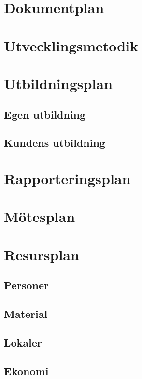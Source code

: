 \documentclass[projektplan/plan.tex]{subfiles}
\begin{document}
\section{Dokumentplan}

\section{Utvecklingsmetodik}


\section{Utbildningsplan}
\subsection{Egen utbildning}
\subsection{Kundens utbildning}

\section{Rapporteringsplan}
\section{Mötesplan}

\section{Resursplan}
\subsection{Personer}
\subsection{Material}
\subsection{Lokaler}
\subsection{Ekonomi}
\end{document}

